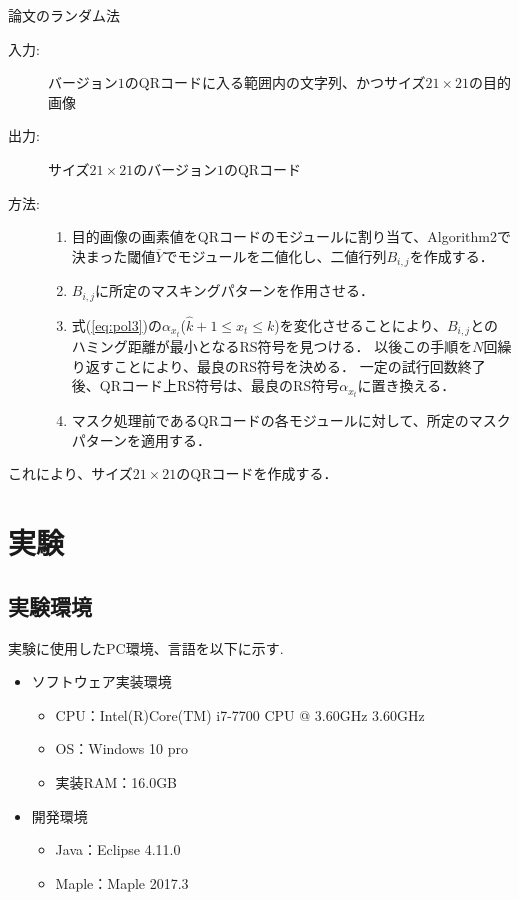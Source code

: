 \documentclass{thesis}
\begin{document}
\begin{algorithm}                      
\caption{論文\cite{KURI}のランダム法}         
\label{alg:alg3} 
\begin{description}
\item[入力:] バージョン$1$のQRコードに入る範囲内の文字列、かつサイズ$21 \times 21$の目的画像
\item[出力:] サイズ$21 \times 21$のバージョン$1$のQRコード
\item[方法:]
\begin{enumerate}
\item
目的画像の画素値をQRコードのモジュールに割り当て、Algorithm2で決まった閾値$\overline{Y}$でモジュールを二値化し、二値行列$B_{i,j}$を作成する．
\item
$B_{i,j}$に所定のマスキングパターンを作用させる．
\item
式(\ref{eq:pol3})の$\alpha_{x_t}$($\hat{k} + 1 \leq x_t \leq k $)を変化させることにより、$B_{i,j}$とのハミング距離が最小となるRS符号を見つける．
以後この手順を$N$回繰り返すことにより、最良のRS符号を決める．
一定の試行回数終了後、QRコード上RS符号は、最良のRS符号$\alpha_{x_t}$に置き換える．
\item
マスク処理前であるQRコードの各モジュールに対して、所定のマスクパターンを適用する．
\end{enumerate}
\end{description}
\end{algorithm} 
これにより、サイズ$21 \times 21$のQRコードを作成する．


\chapter{実験}

\section{実験環境}

実験に使用したPC環境、言語を以下に示す.

\begin{itemize}
\setlength{\itemsep}{5mm}
 \item ソフトウェア実装環境
    \begin{itemize}
      \item CPU：Intel(R)Core(TM) i7-7700 CPU @ 3.60GHz 3.60GHz
      \item OS：Windows 10 pro
      \item 実装RAM：16.0GB
     \end{itemize}
   \item 開発環境
    \begin{itemize}
      \item Java：Eclipse 4.11.0
      \item Maple：Maple 2017.3
   \end{itemize}
\end{itemize}
\end{document}
